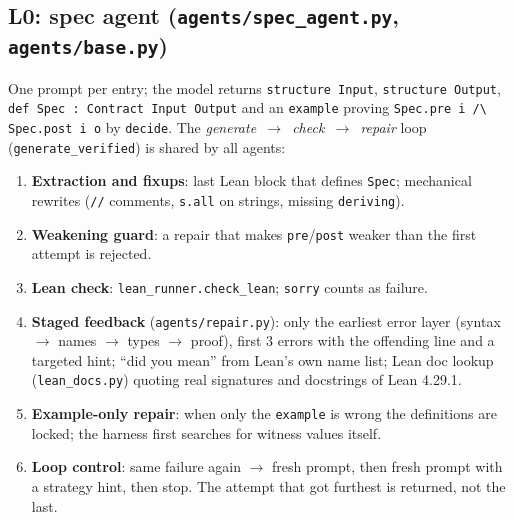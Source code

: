 \documentclass[11pt,a4paper]{article}
\newcommand{\code}[1]{\texttt{#1}}
\newcommand{\file}[1]{\texttt{#1}}
\begin{document}
\subsection{L0: spec agent (\file{agents/spec\_agent.py}, \file{agents/base.py})}
One prompt per entry; the model returns \code{structure Input}, \code{structure Output},
\code{def Spec : Contract Input Output} and an \code{example} proving
\code{Spec.pre i /\textbackslash{} Spec.post i o} by \code{decide}. The
\emph{generate~$\to$~check~$\to$~repair} loop (\code{generate\_verified}) is shared by all agents:
\begin{enumerate}
  \item \textbf{Extraction and fixups}: last Lean block that defines \code{Spec}; mechanical
        rewrites (\code{//} comments, \code{s.all} on strings, missing \code{deriving}).
  \item \textbf{Weakening guard}: a repair that makes \code{pre}/\code{post} weaker than the first
        attempt is rejected.
  \item \textbf{Lean check}: \code{lean\_runner.check\_lean}; \code{sorry} counts as failure.
  \item \textbf{Staged feedback} (\file{agents/repair.py}): only the earliest error layer
        (syntax $\to$ names $\to$ types $\to$ proof), first 3 errors with the offending line and a
        targeted hint; ``did you mean'' from Lean's own name list; Lean doc lookup
        (\file{lean\_docs.py}) quoting real signatures and docstrings of Lean 4.29.1.
  \item \textbf{Example-only repair}: when only the \code{example} is wrong the definitions are
        locked; the harness first searches for witness values itself.
  \item \textbf{Loop control}: same failure again $\to$ fresh prompt, then fresh prompt with a
        strategy hint, then stop. The attempt that got furthest is returned, not the last.
\end{enumerate}
\end{document}
